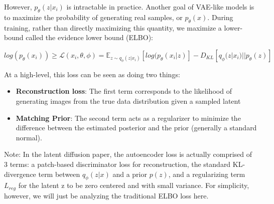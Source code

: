 \documentclass[a4paper]{article}
\begin{document}
However, \(p_{\theta}(z|x_i)\) is intractable in practice. Another goal of VAE-like models is to maximize the probability of generating real samples, or \(p_{\theta}(x)\). During training, rather than directly maximizing this quantity, we maximize a lower-bound called the evidence lower bound (ELBO):
\begin{center}
\(log(p_{\theta}(x_i)) \ge \mathcal{L}(x_{i}, \theta, \phi) = \mathbb{E}_{z\sim q_{\phi}(z|x_{i})}[log(p_{\theta}(x_i | z)] - D_{KL}[q_{\phi}(z|x_{i}) || p_{\theta}(z)]\)
\end{center}
At a high-level, this loss can be seen as doing two things:
\begin{itemize}
    \item \textbf {Reconstruction loss}: The first term corresponds to the likelihood of generating images from the true data distribution given a sampled latent
    \item \textbf {Matching Prior}: The second term acts as a regularizer to minimize the difference between the estimated posterior and the prior (generally a standard normal).
\end{itemize}
Note: In the latent diffusion paper, the autoencoder loss is actually comprised of 3 terms: a patch-based discriminator loss for reconstruction, the standard KL-divergence term between \(q_{\phi}(z|x)\) and a prior \(p(z)\), and a regularizing term \(L_{reg}\) for the latent z to be zero centered and with small variance. For simplicity, however, we will just be analyzing the traditional ELBO loss here.
\end{document}
